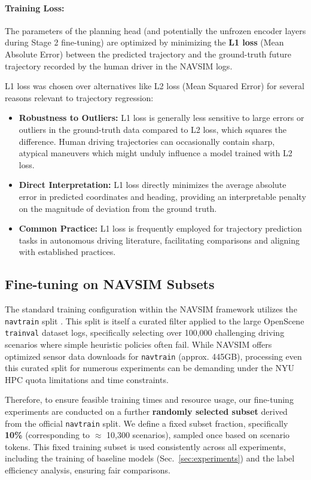 \documentclass{article}
\begin{document}
\paragraph{Training Loss:}
The parameters of the planning head (and potentially the unfrozen encoder layers during Stage 2 fine-tuning) are optimized by minimizing the \textbf{L1 loss} (Mean Absolute Error) between the predicted trajectory and the ground-truth future trajectory recorded by the human driver in the NAVSIM logs.

L1 loss was chosen over alternatives like L2 loss (Mean Squared Error) for several reasons relevant to trajectory regression:
\begin{itemize}
    \item \textbf{Robustness to Outliers:} L1 loss is generally less sensitive to large errors or outliers in the ground-truth data compared to L2 loss, which squares the difference. Human driving trajectories can occasionally contain sharp, atypical maneuvers which might unduly influence a model trained with L2 loss.
    \item \textbf{Direct Interpretation:} L1 loss directly minimizes the average absolute error in predicted coordinates and heading, providing an interpretable penalty on the magnitude of deviation from the ground truth.
    \item \textbf{Common Practice:} L1 loss is frequently employed for trajectory prediction tasks in autonomous driving literature, facilitating comparisons and aligning with established practices.
\end{itemize}

\subsection{Fine-tuning on NAVSIM Subsets}
\label{subsec:subset}
The standard training configuration within the NAVSIM framework utilizes the \texttt{navtrain} split \cite{dauner2024navsim}. This split is itself a curated filter applied to the large OpenScene \texttt{trainval} dataset logs, specifically selecting over 100,000 challenging driving scenarios where simple heuristic policies often fail. While NAVSIM offers optimized sensor data downloads for \texttt{navtrain} (approx. 445GB), processing even this curated split for numerous experiments can be demanding under the NYU HPC quota limitations and time constraints.

Therefore, to ensure feasible training times and resource usage, our fine-tuning experiments are conducted on a further \textbf{randomly selected subset} derived from the official \texttt{navtrain} split. We define a fixed subset fraction, specifically \textbf{10\%} (corresponding to \(\approx\) 10,300 scenarios), sampled once based on scenario tokens. This fixed training subset is used consistently across all experiments, including the training of baseline models (Sec.~\ref{sec:experiments}) and the label efficiency analysis, ensuring fair comparisons.
\end{document}
